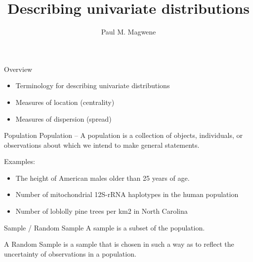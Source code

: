 \documentclass[presentation]{beamer}
\author{Paul M. Magwene}
\date{}
\title{Describing univariate distributions}
\institute[Duke]{Department of Biology}
\begin{document}
\maketitle
{}

\begin{frame}[label={sec:orgheadline1}]{Overview}
\begin{itemize}
\item Terminology for describing univariate distributions
\item Measures of location (centrality)
\item Measures of dispersion (spread)
\end{itemize}
\end{frame}

\begin{frame}[label={sec:orgheadline2}]{Population}
Population -- A population is a collection of objects, individuals, or observations about which we intend to make general statements.

Examples: 

\begin{itemize}
\item The height of American males older than 25 years of age.
\item Number of mitochondrial 12S-rRNA haplotypes in the human population
\item Number of loblolly pine trees per km2 in North Carolina
\end{itemize}
\end{frame}

\begin{frame}[label={sec:orgheadline3}]{Sample / Random Sample}
A sample is a subset of the population.

A Random Sample is a sample that is chosen in such a way as to reflect the
uncertainty of observations in a population.
\end{frame}
\end{document}
